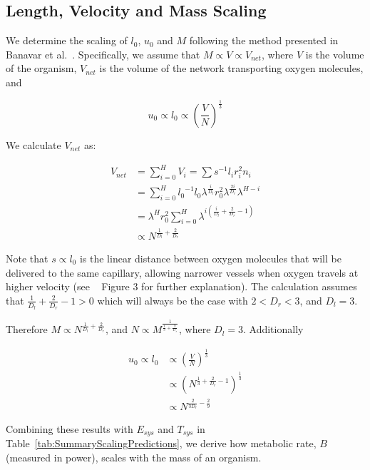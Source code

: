 \documentclass[12pt]{article}
\begin{document}
\subsection{Length, Velocity and Mass Scaling}
\label{subsec:appendixLengthMass}

We determine the scaling of $l_0$, $u_0$ and $M$ following the method 
presented in Banavar et al.~\cite{banavar10}. Specifically, we assume that $M
\propto V \propto V_{net}$, where $V$ is the volume of the organism, $V_{net}$ is the volume of the network
transporting oxygen molecules, and

\begin{equation}
u_0 \propto l_0 \propto \left (\frac{V}{N} \right) ^{\frac{1}{3}}
\end{equation}

We calculate $V_{net}$ as: 

\begin{align*}
V_{net} &= \sum_{i=0}^H V_i = \sum s^{-1} l_i r_i^2 n_i \\
  &= \sum_{i=0}^H {l_0}^{-1} l_0 \lambda^{\frac{i}{D_l}} r_0^2 \lambda^{\frac{2i}{D_r}}
  \lambda^{H-i} \\
  &= \lambda^H r_0^2 \sum_{i=0}^H \lambda^{i \left(\frac{i}{D_l} +
  \frac{2}{D_r} - 1 \right) } \\
  &\propto N^{\frac{1}{D_l} + \frac{2}{D_r}} 
\end{align*}

Note that $s \propto l_0$ is the linear distance between oxygen molecules that will be delivered to the same capillary, allowing narrower vessels when oxygen travels at higher velocity (see ~\cite{banavar10} Figure 3 for further explanation). The calculation assumes that $\frac{1}{D_l} + \frac{2}{D_r} -1 > 0$ which
will always be the case with $2 < D_r < 3$, and $D_l=3$. 

Therefore $M\propto N^{\frac{1}{D_l} +
\frac{2}{D_r}}$,
and $N \propto M^{\frac{1}{\frac{1}{3} + \frac{2}{D_r}}}$, where $D_l=3$.
Additionally

\begin{align*}
u_0 \propto l_0 & \propto \left( \frac{V}{N} \right)^{\frac{1}{3}} \\
    & \propto \left( N^{\frac{1}{3} + \frac{2}{D_r} - 1} \right)^{\frac{1}{3}} \\
    & \propto N^{\frac{2}{3D_r} - \frac{2}{9}}
\end{align*}

Combining these results with $E_{sys}$ and $T_{sys}$ in
Table~\ref{tab:SummaryScalingPredictions}, we derive how metabolic rate, $B$
(measured in power), scales with the mass of an organism.
\end{document}
